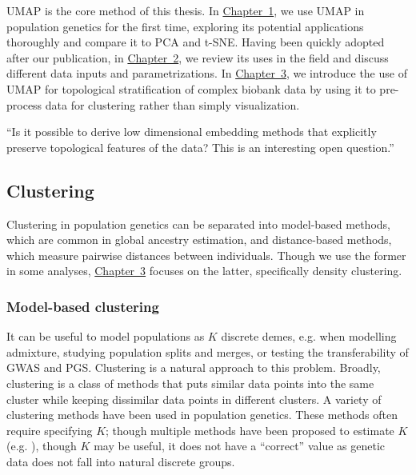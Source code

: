 UMAP is the core method of this thesis. In \hyperref[chap:chapter1]{Chapter~1}, we use UMAP in population genetics for the first time, exploring its potential applications thoroughly and compare it to PCA and t-SNE. Having been quickly adopted after our publication, in \hyperref[chap:chapter2]{Chapter~2}, we review its uses in the field and discuss different data inputs and parametrizations. In \hyperref[chap:chapter3]{Chapter~3}, we introduce the use of UMAP for topological stratification of complex biobank data by using it to pre-process data for clustering rather than simply visualization.

``Is it possible to derive low dimensional embedding methods that explicitly preserve topological features of the data? This is an interesting open question.''\citep{wasserman_topological_2018}

\subsection{Clustering}

Clustering in population genetics can be separated into model-based methods, which are common in global ancestry estimation, and distance-based methods, which measure pairwise distances between individuals. Though we use the former in some analyses, \hyperref[chap:chapter3]{Chapter~3} focuses on the latter, specifically density clustering.

\subsubsection{Model-based clustering}

It can be useful to model populations as $K$ discrete demes, e.g. when modelling admixture, studying population splits and merges, or testing the transferability of GWAS and PGS. Clustering is a natural approach to this problem. Broadly, clustering is a class of methods that puts similar data points into the same cluster while keeping dissimilar data points in different clusters\citep{ben-david_clustering_2018}. A variety of clustering methods have been used in population genetics. These methods often require specifying $K$; though multiple methods have been proposed to estimate $K$ (e.g. \citep{evanno_detecting_2005,verity_estimating_2016}), though $K$ may be useful, it does not have a ``correct'' value as genetic data does not fall into natural discrete groups\citep{lawson_tutorial_2018}.

